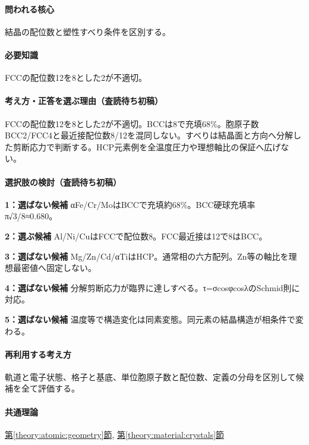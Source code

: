 \paragraph{問われる核心} 結晶の配位数と塑性すべり条件を区別する。

\paragraph{必要知識} FCCの配位数12を8とした2が不適切。

\paragraph{考え方・正答を選ぶ理由（査読待ち初稿）} FCCの配位数12を8とした2が不適切。BCCは8で充填68\%。胞原子数BCC2/FCC4と最近接配位数8/12を混同しない。すべりは結晶面と方向へ分解した剪断応力で判断する。HCP元素例を全温度圧力や理想軸比の保証へ広げない。

\paragraph{選択肢の検討（査読待ち初稿）}\mbox{}\par

\noindent\textbf{1：選ばない候補} αFe/Cr/MoはBCCで充填約68\%。BCC硬球充填率π√3/8≈0.680。\par

\noindent\textbf{2：選ぶ候補} Al/Ni/CuはFCCで配位数8。FCC最近接は12で8はBCC。\par

\noindent\textbf{3：選ばない候補} Mg/Zn/Cd/αTiはHCP。通常相の六方配列。Zn等の軸比を理想最密値へ固定しない。\par

\noindent\textbf{4：選ばない候補} 分解剪断応力が臨界に達しすべる。τ=σcosφcosλのSchmid則に対応。\par

\noindent\textbf{5：選ばない候補} 温度等で構造変化は同素変態。同元素の結晶構造が相条件で変わる。\par

\paragraph{再利用する考え方} 軌道と電子状態、格子と基底、単位胞原子数と配位数、定義の分母を区別して候補を全て評価する。

\paragraph{共通理論} \hyperref[theory:atomic:geometry]{第\ref*{theory:atomic:geometry}節}, \hyperref[theory:material:crystals]{第\ref*{theory:material:crystals}節}


